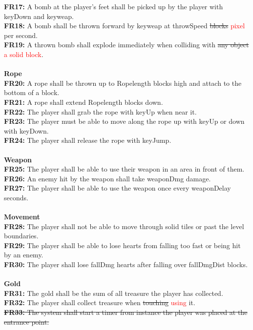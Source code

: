 \documentclass[12pt, titlepage]{article}
\begin{document}
\textbf{FR17:} A bomb at the player's feet shall be picked up by the player with keyDown and keyweap.\\
\textbf{FR18:} A bomb shall be thrown forward by keyweap at throwSpeed \st{blocks} \textcolor{red}{pixel} per second.\\
\textbf{FR19:} A thrown bomb shall explode immediately when colliding with \st{any object} \textcolor{red}{a solid block}.\\
\\
\textbf{Rope}\\
\textbf{FR20:} A rope shall be thrown up to Ropelength blocks high and attach to the bottom of a block.\\
\textbf{FR21:} A rope shall extend Ropelength blocks down.\\
\textbf{FR22:} The player shall grab the rope with keyUp when near it.\\
\textbf{FR23:} The player must be able to move along the rope up with keyUp or down with keyDown.\\
\textbf{FR24:} The player shall release the rope with keyJump.\\
\\
\textbf{Weapon}\\
\textbf{FR25:} The player shall be able to use their weapon in an area in front of them.\\
\textbf{FR26:} An enemy hit by the weapon shall take weaponDmg damage.\\
\textbf{FR27:} The player shall be able to use the weapon once every weaponDelay seconds.\\
\\
\textbf{Movement}\\
\textbf{FR28:} The player shall not be able to move through solid tiles or past the level boundaries.\\
\textbf{FR29:} The player shall be able to lose hearts from falling too fast or being hit by an enemy.\\
\textbf{FR30:} The player shall lose fallDmg hearts after falling over fallDmgDist blocks.\\
\\
\textbf{Gold}\\
\textbf{FR31:} The gold shall be the sum of all treasure the player has collected.\\
\textbf{FR32:} The player shall collect treasure when \st{touching} \textcolor{red}{using} it.\\
\st{\textbf{FR33:} The system shall start a timer from instance the player was placed at the entrance point.}\\
\end{document}
